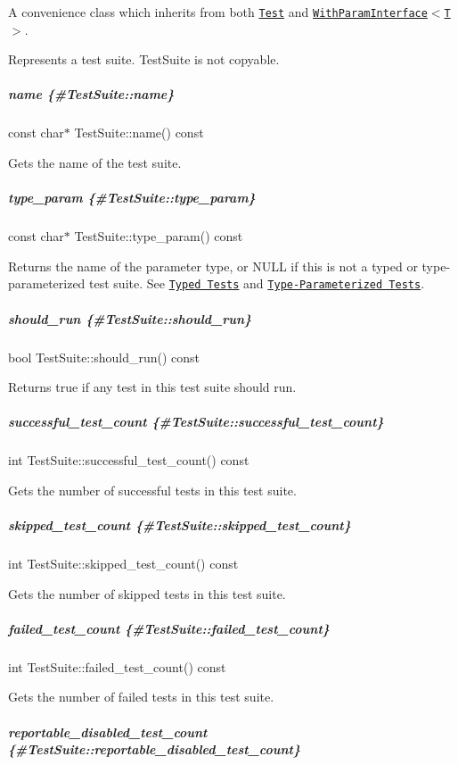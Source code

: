 A convenience class which inherits from both \href{#Test}{\tt {\ttfamily Test}} and \href{#WithParamInterface}{\tt {\ttfamily With\+Param\+Interface$<$T$>$}}.

Represents a test suite. {\ttfamily Test\+Suite} is not copyable.

\subparagraph*{name \{\#\+Test\+Suite\+::name\}}

{\ttfamily const char$\ast$ Test\+Suite\+::name() const}

Gets the name of the test suite.

\subparagraph*{type\+\_\+param \{\#\+Test\+Suite\+::type\+\_\+param\}}

{\ttfamily const char$\ast$ Test\+Suite\+::type\+\_\+param() const}

Returns the name of the parameter type, or {\ttfamily N\+U\+LL} if this is not a typed or type-\/parameterized test suite. See \href{../advanced.md#typed-tests}{\tt Typed Tests} and \href{../advanced.md#type-parameterized-tests}{\tt Type-\/\+Parameterized Tests}.

\subparagraph*{should\+\_\+run \{\#\+Test\+Suite\+::should\+\_\+run\}}

{\ttfamily bool Test\+Suite\+::should\+\_\+run() const}

Returns true if any test in this test suite should run.

\subparagraph*{successful\+\_\+test\+\_\+count \{\#\+Test\+Suite\+::successful\+\_\+test\+\_\+count\}}

{\ttfamily int Test\+Suite\+::successful\+\_\+test\+\_\+count() const}

Gets the number of successful tests in this test suite.

\subparagraph*{skipped\+\_\+test\+\_\+count \{\#\+Test\+Suite\+::skipped\+\_\+test\+\_\+count\}}

{\ttfamily int Test\+Suite\+::skipped\+\_\+test\+\_\+count() const}

Gets the number of skipped tests in this test suite.

\subparagraph*{failed\+\_\+test\+\_\+count \{\#\+Test\+Suite\+::failed\+\_\+test\+\_\+count\}}

{\ttfamily int Test\+Suite\+::failed\+\_\+test\+\_\+count() const}

Gets the number of failed tests in this test suite.

\subparagraph*{reportable\+\_\+disabled\+\_\+test\+\_\+count \{\#\+Test\+Suite\+::reportable\+\_\+disabled\+\_\+test\+\_\+count\}}

